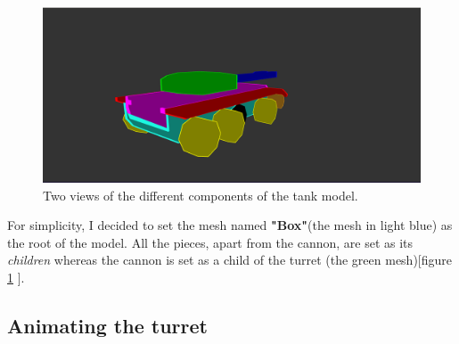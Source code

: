 \documentclass[14pt]{article}
\begin{document}
\begin{figure}[H]
\begin{minipage}[t]{0.45\textwidth}
\end{minipage}
\hfill
\begin{minipage}[t]{0.45\textwidth}
\center
\includegraphics[width=\textwidth]{images/evidencedModel11.png}
\end{minipage}
\caption{Two views of the different components of the tank model.}
\label{img:modelInspection2}
\end{figure}


For simplicity, I decided to set the mesh named \textbf{"Box"}(the mesh in light blue) as the root of the model. All the pieces, apart from the cannon, are set as its \textit{children} whereas the cannon is set as a child of the turret (the green mesh)[figure \ref{img:modelInspection2} ].
\subsection{Animating the turret}
\end{document}
